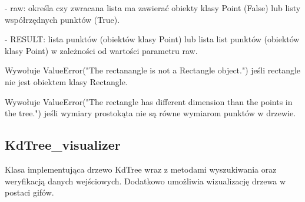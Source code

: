 \documentclass{lab}
\begin{document}
\begin{itemize}
  - raw: określa czy zwracana lista ma zawierać obiekty klasy Point (False) lub listy współrzędnych punktów (True).

  - RESULT: lista punktów (obiektów klasy Point) lub lista list punktów (obiektów klasy Point) w zależności od wartości parametru raw.

  Wywołuje ValueError("The rectanangle is not a Rectangle object.") jeśli rectangle nie jest obiektem klasy Rectangle.

  Wywołuje ValueError("The rectangle has different dimension than the points in the tree.") jeśli wymiary prostokąta nie są równe wymiarom punktów w drzewie.
\end{itemize}

\subsection{KdTree\_visualizer}
Klasa implementująca drzewo KdTree wraz z metodami wyszukiwania oraz weryfikacją danych wejściowych. Dodatkowo umożliwia wizualizację drzewa w postaci gifów.
\end{document}
